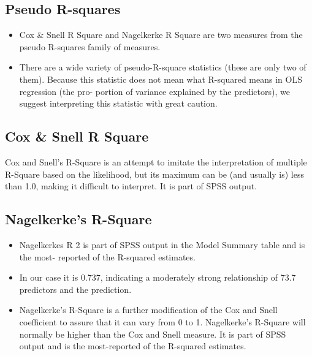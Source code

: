 \documentclass[a4paper,12pt]{article}
\begin{document}
\subsection{Pseudo R-squares}
\begin{itemize}
\item Cox \& Snell R Square and Nagelkerke R Square are two measures from the pseudo
R-squares family of measures.
\item There are a wide variety of pseudo-R-square statistics (these are only two of them).
Because this statistic does not mean what R-squared means in OLS regression (the pro-
portion of variance explained by the predictors), we suggest interpreting this statistic with
great caution.
\end{itemize}
\subsection{Cox \& Snell R Square}
Cox and Snell’s R-Square is an attempt to imitate the interpretation of multiple R-Square based
on the likelihood, but its maximum can be (and usually is) less than 1.0, making it difficult to
interpret. It is part of SPSS output.
\subsection{Nagelkerke’s R-Square}
\begin{itemize}
\item Nagelkerkes R 2 is part of SPSS output in the Model Summary table and is the most-
reported of the R-squared estimates.
\item In our case it is 0.737, indicating a moderately strong relationship of 73.7%
predictors and the prediction.
\item Nagelkerke’s R-Square is a further modification of the Cox and Snell coefficient to assure
that it can vary from 0 to 1. Nagelkerke’s R-Square will normally be higher than the Cox
and Snell measure. It is part of SPSS output and is the most-reported of the R-squared
estimates.
\end{itemize}
\end{document}
